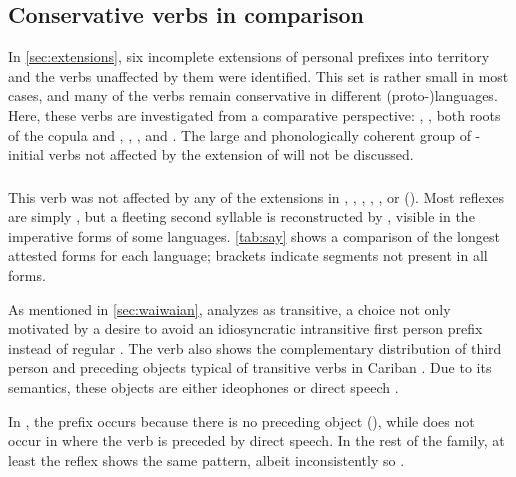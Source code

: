 \subsection{Conservative verbs in comparison}
\label{sec:verbs}
In \cref{sec:extensions}, six incomplete extensions of personal prefixes into  territory and the verbs unaffected by them were identified.
This set is rather small in most cases, and many of the verbs remain conservative in different (proto-)languages.
Here, these verbs are investigated from a comparative perspective:
  ,   , both roots of the copula  and  ,   ,    , and   .
The large and phonologically coherent group of -initial verbs not affected by the extension of \akuriyo {}  will not be discussed.




\subsubsection{ }
\label{sec:say}
This verb was not affected by any of the extensions in \PPek, \PWai, \PTir, \akuriyo, \carijo, or \yukpa ().
Most reflexes are simply , but a fleeting second syllable  is reconstructed by \textcite{gildea2007greenberg}, visible in the imperative forms of some languages. %
%
%
\cref{tab:say} shows a comparison of the longest attested forms for each language; brackets indicate segments not present in all forms.
%
%
%


As mentioned in \cref{sec:waiwaian}, \textcite{hixkaryanaderby1985} analyzes \hixka {} as transitive, a choice not only motivated by a desire to avoid an idiosyncratic intransitive first person prefix  instead of regular .
The verb also shows the complementary distribution of third person  and preceding objects typical of transitive verbs in Cariban \parencite[60--81]{gildea1998}.
Due to its semantics, these objects are either ideophones or direct speech .

In , the prefix  occurs because there is no preceding object (), while does not occur in  where the verb is preceded by direct speech.
In the rest of the family, at least the \trio reflex shows the same pattern, albeit inconsistently so \parencite[267]{triocarlin2004}.

